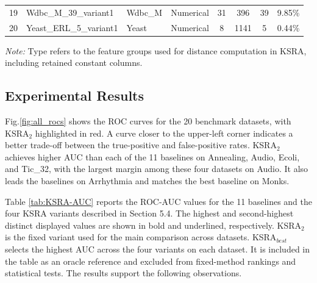 \documentclass[ASNA,twocolumn]{USG} %
\begin{document}
\begin{table}[!ht]
\begin{tabular}{lllccccc}
            19 & Wdbc\_M\_39\_variant1 & Wdbc\_M & Numerical & 31 & 396 & 39 & 9.85\% \\
            20 & Yeast\_ERL\_5\_variant1 & Yeast & Numerical & 8 & 1141 & 5 & 0.44\% \\
            \bottomrule
        \end{tabular}
        \par\vspace{2pt}
        \parbox{\textwidth}{\footnotesize\textit{Note:} Type refers to the feature groups used for distance computation in KSRA, including retained constant columns.}
\end{table}


\subsection{Experimental Results}

Fig.\ref{fig:all_rocs} shows the ROC curves for the 20 benchmark datasets, with KSRA$_2$ highlighted in red. A curve closer to the upper-left corner indicates a better trade-off between the true-positive and false-positive rates. KSRA$_2$ achieves higher AUC than each of the 11 baselines on Annealing, Audio, Ecoli, and Tic\_32, with the largest margin among these four datasets on Audio. It also leads the baselines on Arrhythmia and matches the best baseline on Monks.

Table \ref{tab:KSRA-AUC} reports the ROC-AUC values for the 11 baselines and the four KSRA variants described in Section 5.4. The highest and second-highest distinct displayed values are shown in bold and underlined, respectively. KSRA$_2$ is the fixed variant used for the main comparison across datasets. KSRA$_{best}$ selects the highest AUC across the four variants on each dataset. It is included in the table as an oracle reference and excluded from fixed-method rankings and statistical tests. The results support the following observations.
\end{document}
